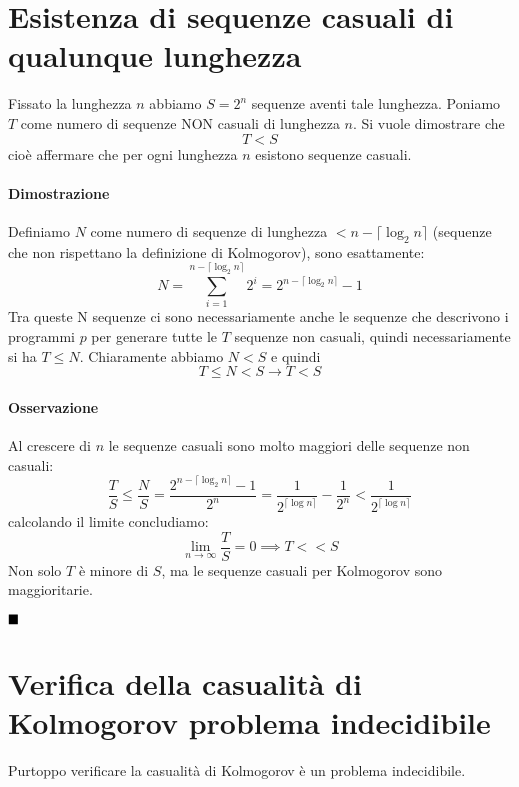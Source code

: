 \section{Esistenza di sequenze casuali di qualunque lunghezza}
Fissato la lunghezza $n$ abbiamo $S=2^n$ sequenze aventi tale lunghezza. Poniamo $T$ come numero di sequenze NON casuali di lunghezza $n$. Si vuole dimostrare che \[T < S\]cioè affermare che per ogni lunghezza $n$ esistono sequenze casuali.
\paragraph{Dimostrazione} Definiamo $N$ come numero di sequenze di lunghezza $ < n - \lceil \log_2n \rceil$ (sequenze che non rispettano la definizione di Kolmogorov), sono esattamente: \[N=\sum_{i = 1}^{n - \lceil \log_2n \rceil} 2^i = 2^{n - \lceil \log_2n \rceil} - 1\]
Tra queste N sequenze ci sono necessariamente anche le sequenze che descrivono i programmi $p$ per generare tutte le $T$ sequenze non casuali, quindi necessariamente si ha $T \leq N$. Chiaramente abbiamo $N < S$ e quindi
$$
T \leq N < S \longrightarrow T < S
$$
\paragraph{Osservazione} Al crescere di $n$ le sequenze casuali sono molto maggiori delle sequenze non casuali:
$$
    \frac{T}{S} \leq \frac{N}{S} = \frac{2^{n - \lceil \log_2 n \rceil} -1}{2^n} = \frac{1}{2^{\lceil \log n \rceil}} - \frac{1}{2^n} < \frac{1}{2^{\lceil \log n \rceil}}
$$
calcolando il limite concludiamo:
$$
    \lim_{n \to \infty} \frac{T}{S} = 0 \implies T << S
$$
Non solo $T$ è minore di $S$, ma le sequenze casuali per Kolmogorov sono maggioritarie.

$\hfill\blacksquare$
\section{Verifica della casualità di Kolmogorov problema indecidibile}
Purtoppo verificare la casualità di Kolmogorov è un problema indecidibile.
